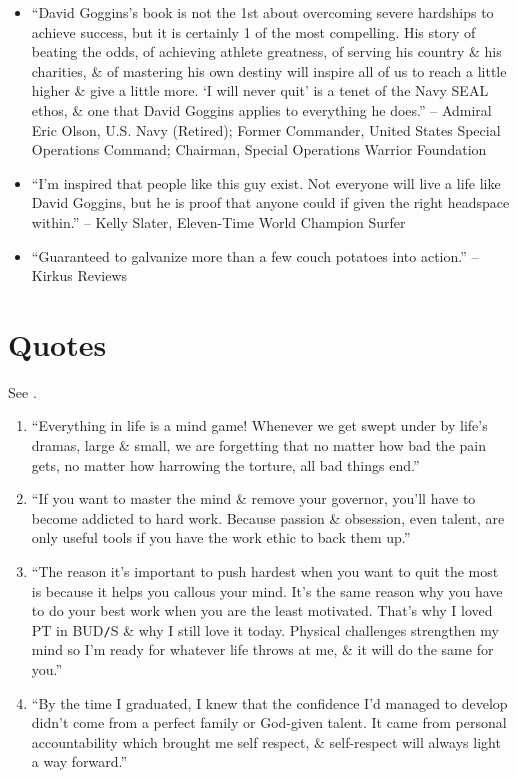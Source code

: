 \documentclass{article}
\numberwithin{equation}{section}
\begin{document}
\begin{itemize}
	\item ``David Goggins's book is not the 1st about overcoming severe hardships to achieve success, but it is certainly 1 of the most compelling. His story of beating the odds, of achieving athlete greatness, of serving his country \& his charities, \& of mastering his own destiny will inspire all of us to reach a little higher \& give a little more. `I will never quit' is a tenet of the Navy SEAL ethos, \& one that David Goggins applies to everything he does.'' -- Admiral Eric Olson, U.S. Navy (Retired); Former Commander, United States Special Operations Command; Chairman, Special Operations Warrior Foundation
	\item ``I'm inspired that people like this guy exist. Not everyone will live a life like David Goggins, but he is proof that anyone could if given the right headspace within.'' -- Kelly Slater, Eleven-Time World Champion Surfer
	\item ``Guaranteed to galvanize more than a few couch potatoes into action.'' -- Kirkus Reviews
\end{itemize}


\section{Quotes}
See \cite{Goggins2018}.
\begin{enumerate}
	\item ``Everything in life is a mind game! Whenever we get swept under by life's dramas, large \& small, we are forgetting that no matter how bad the pain gets, no matter how harrowing the torture, all bad things end.''
	\item ``If you want to master the mind \& remove your governor, you'll have to become addicted to hard work. Because passion \& obsession, even talent, are only useful tools if you have the work ethic to back them up.''
	\item ``The reason it's important to push hardest when you want to quit the most is because it helps you callous your mind. It's the same reason why you have to do your best work when you are the least motivated. That's why I loved PT in BUD\texttt{/}S \& why I still love it today. Physical challenges strengthen my mind so I'm ready for whatever life throws at me, \& it will do the same for you.''
	\item ``By the time I graduated, I knew that the confidence I'd managed to develop didn't come from a perfect family or God-given talent. It came from personal accountability which brought me self respect, \& self-respect will always light a way forward.''
\end{enumerate}


\printbibliography[heading=bibintoc]
	
\end{document}
